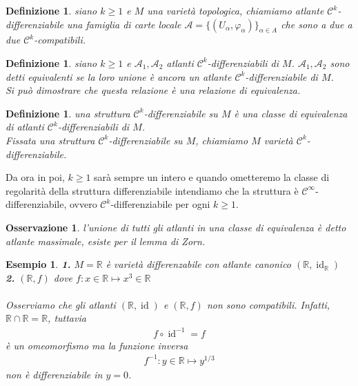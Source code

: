 \documentclass[oneside, 11pt]{amsbook}
\newcommand{\A}{\mathcal{A}}
\newcommand{\C}{\mathcal{C}}
\newcommand{\R}{\mathbb{R}}
\newcommand{\vp}{\varphi}
\newcommand{\co}[1]{\textit{#1}}
\newcommand{\gr}[1]{\textbf{#1}}
\newcommand{\id}{\operatorname{id}}
\newcommand{\0}{{(0)}}
\newcommand{\3}{{(3)}}
\theoremstyle{colonplain}
\theoremstyle{colondefinition}
\newtheorem{defn}[thm]{Definizione}
\newtheorem{ex}[thm]{Esempio}
\theoremstyle{colonremark}
\newtheorem{rmk}[thm]{Osservazione}
\numberwithin{equation}{chapter}
\begin{document}
\begin{defn}
    siano $k \geq 1$ e $M$ una varietà topologica, chiamiamo \co{atlante} $\C^k$-\co{differenziabile} una famiglia di carte locale $\A = \{(U_\alpha, \vp_\alpha)\}_{\alpha \in A}$ che sono a due a due $\C^k$-compatibili.
\end{defn}
\begin{defn}
    siano $k \geq 1$ e $\A_1, \A_2$ atlanti $\C^k$-differenziabili di $M$. $\A_1, \A_2$ sono detti \co{equivalenti} se la loro unione è ancora un atlante $\C^k$-differenziabile di $M$. \\
    Si può dimostrare che questa relazione è una relazione di equivalenza. 
\end{defn}
\begin{defn}
    una \co{struttura} $\C^k$-\co{differenziabile} su $M$ è una classe di equivalenza di atlanti $\C^k$-differenziabili di $M$. \\
    Fissata una struttura $\C^k$-differenziabile su $M$, chiamiamo $M$ \co{varietà} $\C^k$-differenziabile.
\end{defn}
Da ora in poi, $k \geq 1$ sarà sempre un intero e quando ometteremo la classe di regolarità della struttura differenziabile intendiamo che la struttura è $\C^\infty$-differenziabile, ovvero $\C^k$-differenziabile per ogni $k \geq 1$.
\begin{rmk}
    l'unione di tutti gli atlanti in una classe di equivalenza è detto \co{atlante massimale}, esiste per il \co{lemma di Zorn}.
\end{rmk}
\begin{ex}
    \gr{1.} $M = \R$ è varietà differenzabile con atlante canonico $(\R, \id_\R)$\\
    \gr{2.} $(\R, f)$ dove $f : x \in \R \mapsto x^3 \in \R$ \\ \\
    Osserviamo che gli atlanti $(\R, \id)$ e $(\R, f)$ non sono compatibili. Infatti, $\R \cap \R = \R$, tuttavia
    \begin{align}
        f \circ \id^{-1} = f
    \end{align}
    è un omeomorfismo ma la funzione inversa
    \begin{align}
        f^{-1} : y \in \R \mapsto y^{1/3}
    \end{align}
    non è differenziabile in $y = 0$.
\end{ex}
\end{document}
